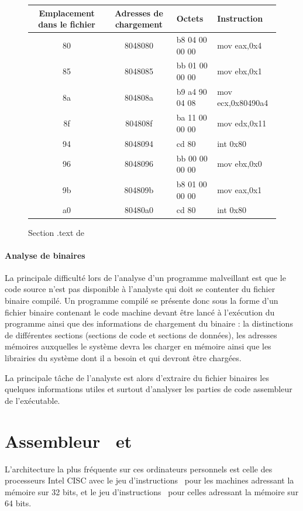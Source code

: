 \begin{figure}
\begin{center}
\begin{tabular}{|c|c|l|l|}
\hline
Emplacement dans le fichier & Adresses de chargement & Octets & Instruction\\ 
\hline
80 & 8048080 & b8 04 00 00 00 & mov    eax,0x4       \\
85 & 8048085 & bb 01 00 00 00 & mov    ebx,0x1       \\
8a & 804808a & b9 a4 90 04 08 & mov    ecx,0x80490a4 \\
8f & 804808f & ba 11 00 00 00 & mov    edx,0x11      \\
94 & 8048094 & cd 80          & int    0x80          \\
96 & 8048096 & bb 00 00 00 00 & mov    ebx,0x0       \\
9b & 804809b & b8 01 00 00 00 & mov    eax,0x1       \\
a0 & 80480a0 & cd 80          & int    0x80          \\
\hline
\end{tabular}
\end{center}
\caption{Section .text de \helloworld}
\label{fig:text_helloworld}
\end{figure}


\paragraph{Analyse de binaires}
La principale difficulté lors de l'analyse d'un programme malveillant est que le code source n'est pas disponible à l'analyste qui doit se contenter du fichier binaire compilé.
Un programme compilé se présente donc sous la forme d'un fichier binaire contenant le code machine devant être lancé à l'exécution du programme ainsi que des informations de chargement du binaire : la distinctions de différentes sections (sections de code et sections de données), les adresses mémoires auxquelles le système devra les charger en mémoire ainsi que les librairies du système dont il a besoin et qui devront être chargées.

La principale tâche de l'analyste est alors d'extraire du fichier binaires les quelques informations utiles et surtout d'analyser les parties de code assembleur de l'exécutable.

\section{Assembleur \xq\ et \xs}
L'architecture la plus fréquente sur ces ordinateurs personnels est celle des processeurs Intel CISC avec le jeu d'instructions \xq\ pour les machines adressant la mémoire sur 32 bits, et le jeu d'instructions \xs\ pour celles adressant la mémoire sur 64 bits.

